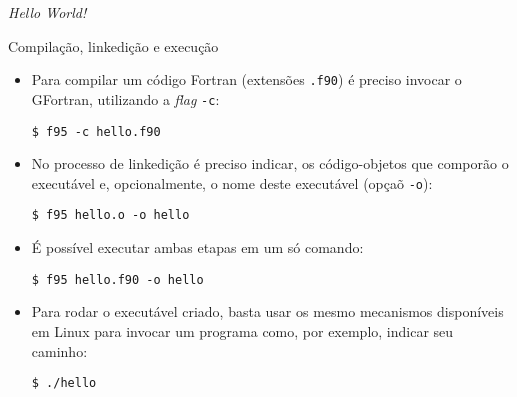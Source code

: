 \begin{frame}[fragile]{\it Hello World!}
\end{frame}

\begin{frame}[fragile]{Compilação, linkedição e execução}

    \begin{itemize}
        \item Para compilar um código Fortran (extensões \texttt{.f90})
            é preciso invocar o GFortran, utilizando a \textit{flag} \texttt{-c}:

        \begin{center}
            \verb|$ f95 -c hello.f90|
        \end{center}
        
        \item No processo de linkedição é preciso indicar, os código-objetos que comporão o 
            executável e, opcionalmente, o nome deste executável (opçaõ \texttt{-o}):

        \begin{center}
            \verb|$ f95 hello.o -o hello|
        \end{center}

        \item É possível executar ambas etapas em um só comando:
        \begin{center}
            \verb|$ f95 hello.f90 -o hello|
        \end{center}

        \item Para rodar o executável criado, basta usar os mesmo mecanismos disponíveis em Linux
            para invocar um programa como, por exemplo, indicar seu caminho:
        
        \begin{center}
            \verb|$ ./hello|
        \end{center}

    \end{itemize}

\end{frame}

